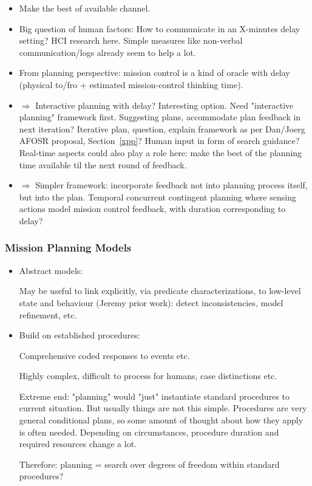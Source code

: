 \begin{itemize}

\item Make the best of available channel.
    
\item Big question of human factors: How to communicate in an X-minutes delay setting? HCI research here. Simple measures like non-verbal communication/logs already seem to help a lot.
    
\item From planning perspective: mission control is a kind of oracle with delay (physical to/fro + estimated mission-control thinking time).
    
\item $\Rightarrow$ Interactive planning with delay? Interesting option. Need "interactive planning" framework first. Suggesting plans, accommodate plan feedback in next iteration? Iterative plan, question, explain framework as per Dan/Joerg AFOSR proposal, Section~\ref{xpp}? Human input in form of search guidance? Real-time aspects could also play a role here: make the best of the planning time available til the next round of feedback.
    
\item $\Rightarrow$ Simpler framework: incorporate feedback not into planning process itself, but into the plan. Temporal concurrent contingent planning where sensing actions model mission control feedback, with duration corresponding to delay?
    
\end{itemize}



\subsubsection{Mission Planning Models}

\begin{itemize}

\item Abstract models:

    May be useful to link explicitly, via predicate characterizations, to low-level state and behaviour (Jeremy prior work): detect inconsistencies, model refinement, etc.
 
\item Build on established procedures:

    Comprehensive coded responses to events etc.
    
    Highly complex, difficult to process for humans, case distinctions etc.
    
    Extreme end: "planning" would "just" instantiate standard procedures to current situation. But usually things are not this simple.  Procedures are very general conditional plans, so some amount of thought about how they apply is often needed.  Depending on circumstances, procedure duration and required resources change a lot. 
    
    Therefore: planning = search over degrees of freedom within standard procedures?
    
\end{itemize}





